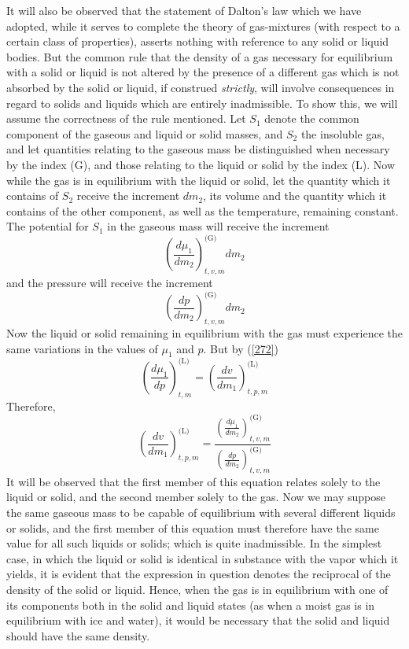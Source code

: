 \documentclass[12pt]{article}
\begin{document}
It will also be observed that the statement of Dalton's law which we have adopted, while it serves to complete the theory of gas-mixtures (with respect to a certain class of properties), asserts nothing with reference to any solid or liquid bodies. But the common rule that the density of a gas necessary for equilibrium with a solid or liquid is not altered by the presence of a different gas which is not absorbed by the solid or liquid, if construed \textit{strictly}, will involve consequences in regard to solids and liquids which are entirely inadmissible. To show this, we will assume the correctness of the rule mentioned. Let $S_1$ denote the common component of the gaseous and liquid or solid masses, and $S_2$ the insoluble gas, and let quantities relating to the gaseous mass be distinguished when necessary by the index (G), and those relating to the liquid or solid by the index (L). Now while the gas is in equilibrium with the liquid or solid, let the quantity which it contains of $S_2$ receive the increment $dm_2$, its volume and the quantity which it contains of the other component, as well as the temperature, remaining constant. The potential for $S_1$ in the gaseous mass will receive the increment
$$ \left( \frac{d\mu_1}{dm_2} \right)_{t,v,m}^{\text{(G)}}  dm_2 $$ 
and the pressure will receive the increment
$$ \left( \frac{d p}{d m_2} \right)_{t,v,m}^{\text{(G)}}  dm_2 $$ 
Now the liquid or solid remaining in equilibrium with the gas must experience the same variations in the values of $\mu_1$ and $p$. But by (\ref{272})
$$   \left( \frac{d\mu_1}{d p} \right)_{t,m}^{\text{(L)}}    =
  \left( \frac{d v}{d m_1} \right)_{t,p,m}^{\text{(L)}}     $$
Therefore,          
$$ \left( \frac{d v}{d m_1} \right)_{t,p,m}^{\text{(L)}}  =
\frac{\left( \frac{d\mu_1}{dm_2} \right)_{t,v,m}^{\text{(G)}} }{\left( \frac{d p}{dm_2} \right)_{t,v,m}^{\text{(G)}} }   $$
It will be observed that the first member of this equation relates solely to the liquid or solid, and the second member solely to the gas. Now we may suppose the same gaseous mass to be capable of equilibrium with several different liquids or solids, and the first member of this equation must therefore have the same value for all such liquids or solids; which is quite inadmissible. In the simplest case, in which the liquid or solid is identical in substance with the vapor which it yields, it is evident that the expression in question denotes the reciprocal of the density of the solid or liquid. Hence, when the gas is in equilibrium with one of its components both in the solid and liquid states (as when a moist gas is in equilibrium with ice and water), it would be necessary that the solid and liquid should have the same density.
\end{document}
